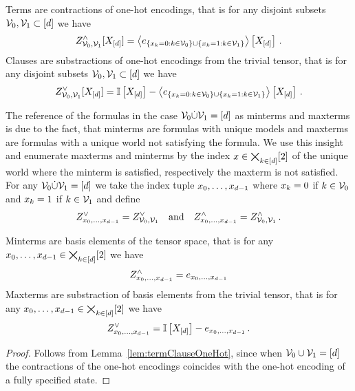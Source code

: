 \begin{lemma}\label{lem:termClauseOneHot}
	Terms are contractions of one-hot encodings, that is for any disjoint subsets $\mathcal{V}_0,\mathcal{V}_1\subset[d]$ we have
		\[ Z^{\land}_{\mathcal{V}_0,\mathcal{V}_1}[X_{[d]}] = \left\langle e_{\{x_{k}=0 : k \in \mathcal{V}_0 \} \cup \{x_{k}=1 : k \in \mathcal{V}_1\}}\right\rangle \left[ X_{[d]} \right] \, . \]
	Clauses are substractions of one-hot encodings from the trivial tensor, that is for any disjoint subsets $\mathcal{V}_0,\mathcal{V}_1\subset[d]$ we have
		\[ Z^{\lor}_{\mathcal{V}_0,\mathcal{V}_1}[X_{[d]}] = 
		\mathbb{I}\left[X_{[d]}\right] -
		\left\langle e_{\{x_{k}=0 : k \in \mathcal{V}_0 \} \cup \{x_{k}=1 : k \in \mathcal{V}_1\}}\right\rangle \left[ X_{[d]} \right] \, . \]
\end{lemma}


	
%
The reference of the formulas in the case $\mathcal{V}_0\dot{\cup}\mathcal{V}_1 = [d]$ as minterms and maxterms is due to the fact, that minterms are formulas with unique models and maxterms are formulas with a unique world not satisfying the formula.
We use this insight and enumerate maxterms and minterms by the index $x\in\bigtimes_{k\in[d]}[2]$ of the unique world where the minterm is satisfied, respectively the maxterm is not satisfied.
For any $\mathcal{V}_0\dot{\cup}\mathcal{V}_1 = [d]$ we take the index tuple $x_{0},\ldots,x_{d-1}$ where $x_{k}=0$ if $k\in\mathcal{V}_0$ and $x_{k}=1$ if $k\in\mathcal{V}_1$ and define
\begin{align*}
	Z^{\lor}_{x_{0},\ldots,x_{d-1}} = Z^{\lor}_{\mathcal{V}_0,\mathcal{V}_1} \quad \text{and} \quad Z^{\land}_{x_{0},\ldots,x_{d-1}} = Z^{\land}_{\mathcal{V}_0,\mathcal{V}_1} \, .
\end{align*}


\begin{corollary}
	Minterms are basis elements of the tensor space, that is for any $x_{0},\ldots,x_{d-1}\in\bigtimes_{k\in[d]}[2]$ we have
	\begin{align*}
		Z^{\land}_{x_{0},\ldots,x_{d-1}} = e_{x_{0},\ldots,x_{d-1}}
	\end{align*}
	Maxterms are substraction of basis elements from the trivial tensor, that is for any $x_{0},\ldots,x_{d-1}\in\bigtimes_{k\in[d]}[2]$ we have
	\begin{align*}
		Z^{\lor}_{x_{0},\ldots,x_{d-1}} = \mathbb{I}\left[X_{[d]}\right] - e_{x_{0},\ldots,x_{d-1}} \, .
	\end{align*}
\end{corollary}
\begin{proof}
	Follows from Lemma~\ref{lem:termClauseOneHot}, since when $\mathcal{V}_0\cup\mathcal{V}_1 = [d]$ the contractions of the one-hot encodings coincides with the one-hot encoding of a fully specified state.
\end{proof}


